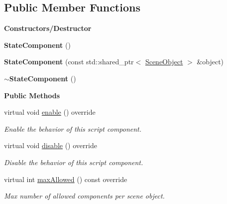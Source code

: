 \subsection*{Public Member Functions}
\begin{Indent}\textbf{ Constructors/\+Destructor}\par
\begin{DoxyCompactItemize}
\item 
\mbox{\label{classrev_1_1_state_component_ad2fcc1d196b282bcffbb72ef6159dbe2}} 
{\bfseries State\+Component} ()
\item 
\mbox{\label{classrev_1_1_state_component_ad799a36240ac00983e9244ba4d632c1b}} 
{\bfseries State\+Component} (const std\+::shared\+\_\+ptr$<$ \mbox{\hyperlink{classrev_1_1_scene_object}{Scene\+Object}} $>$ \&object)
\item 
\mbox{\label{classrev_1_1_state_component_a3f00f0771f722d251ea0e63935135ae0}} 
{\bfseries $\sim$\+State\+Component} ()
\end{DoxyCompactItemize}
\end{Indent}
\begin{Indent}\textbf{ Public Methods}\par
\begin{DoxyCompactItemize}
\item 
\mbox{\label{classrev_1_1_state_component_ad2be169668770795614e39b1bde925b0}} 
virtual void \mbox{\hyperlink{classrev_1_1_state_component_ad2be169668770795614e39b1bde925b0}{enable}} () override
\begin{DoxyCompactList}\small\item\em Enable the behavior of this script component. \end{DoxyCompactList}\item 
\mbox{\label{classrev_1_1_state_component_a191b4c2bca45404783d7168f3a83b2be}} 
virtual void \mbox{\hyperlink{classrev_1_1_state_component_a191b4c2bca45404783d7168f3a83b2be}{disable}} () override
\begin{DoxyCompactList}\small\item\em Disable the behavior of this script component. \end{DoxyCompactList}\item 
\mbox{\label{classrev_1_1_state_component_a801025ae9c32d3b5eaa4d50c773e14c2}} 
virtual int \mbox{\hyperlink{classrev_1_1_state_component_a801025ae9c32d3b5eaa4d50c773e14c2}{max\+Allowed}} () const override
\begin{DoxyCompactList}\small\item\em Max number of allowed components per scene object. \end{DoxyCompactList}\end{DoxyCompactItemize}
\end{Indent}

